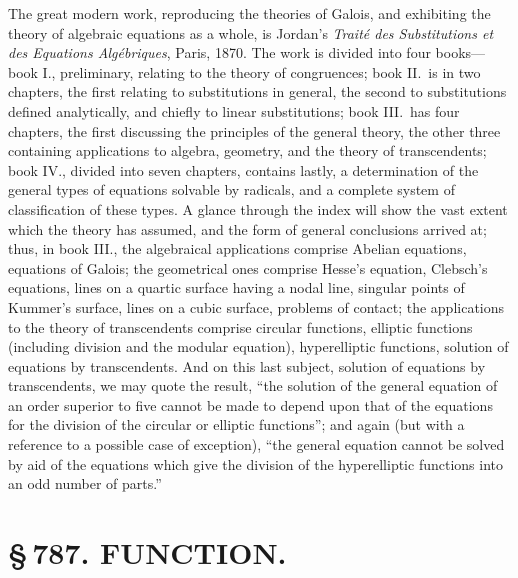 \documentclass[11pt,a4paper]{article}
\begin{document}
The great modern work, reproducing the theories of Galois, and exhibiting the theory of algebraic equations as a whole, is Jordan's \textit{Trait\'{e} des Substitutions et des Equations Alg\'{e}briques}, Paris, 1870. The work is divided into four books---book I., preliminary, relating to the theory of congruences; book II.\ is in two chapters, the first relating to substitutions in general, the second to substitutions defined analytically, and chiefly to linear substitutions; book III.\ has four chapters, the first discussing the principles of the general theory, the other three containing applications to algebra, geometry, and the theory of transcendents; book IV., divided into seven chapters, contains lastly, a determination of the general types of equations solvable by radicals, and a complete system of classification of these types. A glance through the index will show the vast extent which the theory has assumed, and the form of general conclusions arrived at; thus, in book III., the algebraical applications comprise Abelian equations, equations of Galois; the geometrical ones comprise Hesse's equation, Clebsch's equations, lines on a quartic surface having a nodal line, singular points of Kummer's surface, lines on a cubic surface, problems of contact; the applications to the theory of transcendents comprise circular functions, elliptic functions (including division and the modular equation), hyperelliptic functions, solution of equations by transcendents. And on this last subject, solution of equations by transcendents, we may quote the result, ``the solution of the general equation of an order superior to five cannot be made to depend upon that of the equations for the division of the circular or elliptic functions''; and again (but with a reference to a possible case of exception), ``the general equation cannot be solved by aid of the equations which give the division of the hyperelliptic functions into an odd number of parts.''

\newpage
\section*{\S\,787. FUNCTION.}


\smallskip
\end{document}
